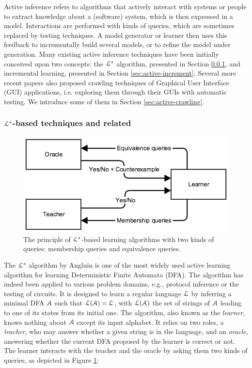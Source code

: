Active inference refers to algorithms that actively interact with
systems or people to extract knowledge about a (software) system,
which is then expressed in a model. Interactions are performed
with kinds of queries, which are sometimes replaced by testing
techniques. A model generator or learner then uses this feedback
to incrementally build several models, or to refine the model
under generation. Many existing active inference techniques have
been initially conceived upon two concepts: the $\EuScript{L}^*$
algorithm, presented in Section \ref{sec:active-letoile}, and
incremental learning, presented in Section
\ref{sec:active-increment}. Several more recent papers also
proposed crawling techniques of Graphical User Interface (GUI)
applications, i.e. exploring them through their GUIs with
automatic testing. We introduce some of them in Section
\ref{sec:active-crawling}.

\subsubsection{$\EuScript{L}^*$-based techniques and related}
\label{sec:active-letoile}

\begin{figure}[h]
    \begin{center}
        \includegraphics[width=0.9\linewidth]{figures/angluin.png}
    \end{center}

    \caption{The principle of $\EuScript{L}^*$-based learning
    algorithms with two kinds of queries: membership queries and
    equivalence queries.}
    \label{fig:angluin}
\end{figure}

The $\EuScript{L}^*$ algorithm by Angluin \cite{Angluin198787} is
one of the most widely used active learning algorithm for
learning Deterministic Finite Automata (DFA). The algorithm has
indeed been applied to various problem domains, e.g., protocol
inference or the testing of circuits. It is designed to learn a
regular language $\EuScript{L}$ by inferring a minimal DFA
$\EuScript{A}$ such that
$\EuScript{L}(\EuScript{A})=\EuScript{L}$, with
$\EuScript{L}(\EuScript{A})$ the set of strings of $\EuScript{A}$
leading to one of its states from its initial one. The algorithm,
also known as the \textit{learner}, knows nothing about
$\EuScript{A}$ except its input alphabet. It relies on two roles,
a \textit{teacher}, who may answer whether a given string is in
the language, and an \textit{oracle}, answering whether the
current DFA proposed by the learner is correct or not. The
learner interacts with the teacher and the oracle by asking them
two kinds of queries, as depicted in Figure \ref{fig:angluin}:

